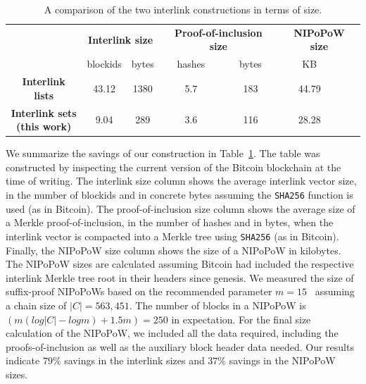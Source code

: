 
\begin{table}[h!]
  \begin{center}
    \begin{tabular}{|c|cc|cc|cc|}
      \hline
      & \multicolumn{2}{c|}{\bf Interlink size}
      & \multicolumn{2}{c|}{\bf Proof-of-inclusion size}
      & \multicolumn{2}{c|}{\bf NIPoPoW size}\\
      & blockids & bytes & hashes & bytes & KB\\
      \hhline{-------}
      \textbf{Interlink lists}&
      43.12 & 1380 & 5.7 & 183 & 44.79\\
      \hline
      \makecell{\bf Interlink sets\\(this work)}&
      9.04 & 289 & 3.6 & 116 & 28.28\\
      \hline
    \end{tabular}
    \vspace{10pt}
    \caption{A comparison of the two interlink constructions in terms of size.}
    \label{tab.savings}
  \end{center}
\end{table}

We summarize the savings of our construction in Table~\ref{tab.savings}. The
table was constructed by inspecting the current version of the Bitcoin
blockchain at the time of writing. The interlink size column shows the average
interlink vector size, in the number of blockids and in concrete bytes assuming
the \texttt{SHA256} function is used (as in Bitcoin). The proof-of-inclusion
size column shows the average size of a Merkle proof-of-inclusion, in the number
of hashes and in bytes, when the interlink vector is compacted into a Merkle
tree using \texttt{SHA256} (as in Bitcoin). Finally, the NIPoPoW size column
shows the size of a NIPoPoW in kilobytes. The NIPoPoW sizes are calculated
assuming Bitcoin had included the respective interlink Merkle tree root in their
headers since genesis. We measured the size of suffix-proof NIPoPoWs based on
the recommended parameter $m = 15$~\cite{nipopows} assuming a chain size of $|C|
= 563{,}451$. The number of blocks in a NIPoPoW is $(m(log |C| - log m) + 1.5m)
= 250$ in expectation. For the final size calculation of the NIPoPoW, we
included all the data required, including the proofs-of-inclusion as well as the
auxiliary block header data needed. Our results indicate $79\%$ savings in the
interlink sizes and $37\%$ savings in the NIPoPoW sizes.
